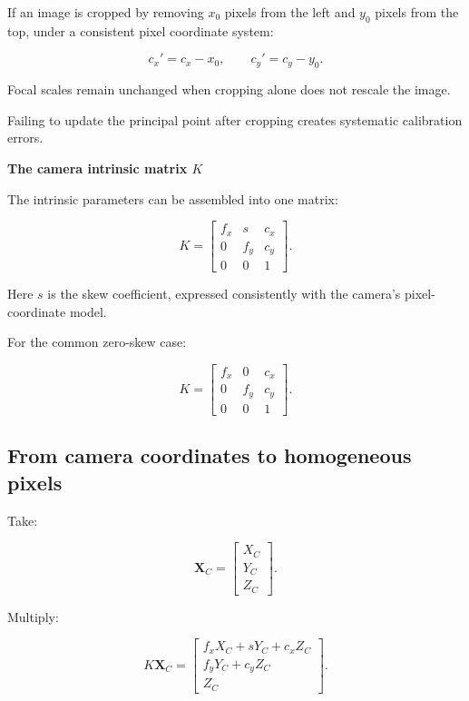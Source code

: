 \hypertarget{02-foundations-ii-ch034-cropping}{}

If an image is cropped by removing \(x_0\) pixels from the left and \(y_0\) pixels from the top, under a consistent pixel coordinate system:

\[
 \boxed{ c_x'=c_x-x_0, \qquad c_y'=c_y-y_0 }.
\]

Focal scales remain unchanged when cropping alone does not rescale the image.

Failing to update the principal point after cropping creates systematic calibration errors.

\textbf{The camera intrinsic matrix \(K\)}

The intrinsic parameters can be assembled into one matrix:

\[
 \boxed{ K= \begin{bmatrix} f_x&s&c_x\\ 0&f_y&c_y\\ 0&0&1 \end{bmatrix} }.
\]

Here \(s\) is the skew coefficient, expressed consistently with the camera's pixel-coordinate model.

For the common zero-skew case:

\[
 \boxed{ K= \begin{bmatrix} f_x&0&c_x\\ 0&f_y&c_y\\ 0&0&1 \end{bmatrix} }.
\]

\subsection{From camera coordinates to homogeneous pixels}\label{02-foundations-ii-ch034-from-camera-coordinates-to-homogeneous-pixels}

\hypertarget{02-foundations-ii-ch034-from-camera-coordinates-to-homogeneous-pixels}{}

Take:

\[
 \mathbf X_C= \begin{bmatrix} X_C\\Y_C\\Z_C \end{bmatrix}.
\]

Multiply:

\[
 K\mathbf X_C= \begin{bmatrix} f_xX_C+sY_C+c_xZ_C\\ f_yY_C+c_yZ_C\\ Z_C \end{bmatrix}.
\]

